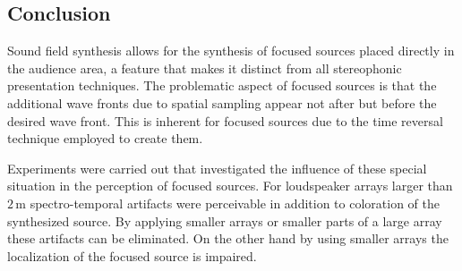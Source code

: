 \subsection{Conclusion}
\label{sec:fs_conclusion}

Sound field synthesis allows for the synthesis of focused sources
placed directly in the audience area, a feature that makes it distinct from all
stereophonic presentation techniques. The problematic aspect of focused sources
is that the additional wave fronts due to spatial sampling appear not after but
before the desired wave front. This is inherent for focused sources due to the
time reversal technique employed to create them.

Experiments were carried out that investigated the influence of these special
situation in the perception of focused sources. For loudspeaker arrays larger
than $2$\,m spectro-temporal artifacts were perceivable in addition to
coloration of the synthesized source. By applying smaller arrays or smaller
parts of a large array these artifacts can be eliminated. On the other hand
by using smaller arrays the localization of the focused source is impaired.
